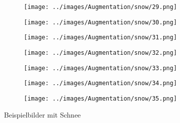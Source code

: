 \begin{figure}[H]
\begin{subfigure}[b]{0.1\textwidth}
\centering
\texttt{[image: ../images/Augmentation/snow/29.png]}
\end{subfigure}
\hspace{1em}%
\begin{subfigure}[b]{0.1\textwidth}
\centering
\texttt{[image: ../images/Augmentation/snow/30.png]}
\end{subfigure}
\hspace{1em}%
\begin{subfigure}[b]{0.1\textwidth}
\centering
\texttt{[image: ../images/Augmentation/snow/31.png]}
\end{subfigure}
\hspace{1em}%
\begin{subfigure}[b]{0.1\textwidth}
\centering
\texttt{[image: ../images/Augmentation/snow/32.png]}
\end{subfigure}
\hspace{1em}%
\begin{subfigure}[b]{0.1\textwidth}
\centering
\texttt{[image: ../images/Augmentation/snow/33.png]}
\end{subfigure}
\hspace{1em}%
\begin{subfigure}[b]{0.1\textwidth}
\centering
\texttt{[image: ../images/Augmentation/snow/34.png]}
\end{subfigure}
\hspace{1em}%
\begin{subfigure}[b]{0.1\textwidth}
\centering
\texttt{[image: ../images/Augmentation/snow/35.png]}
\end{subfigure}
\caption{Beispielbilder mit Schnee}
\label{fig:snow-imgs}
\end{figure}

